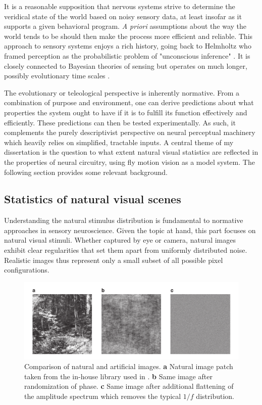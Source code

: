 It is a reasonable supposition that nervous systems strive to determine the veridical state of the world based on noisy sensory data, at least insofar as it supports a given behavioral program. \textit{A priori} assumptions about the way the world tends to be should then make the process more efficient and reliable. This approach to sensory systems enjoys a rich history, going back to Helmholtz who framed perception as the probabilistic problem of "unconscious inference" \citep{Helmholtz:1867aa}. It is closely connected to Bayesian theories of sensing but operates on much longer, possibly evolutionary time scales \citep{Doya:2007aa}.

The evolutionary or teleological perspective is inherently normative. From a combination of purpose and environment, one can derive predictions about what properties the system ought to have if it is to fulfill its function effectively and efficiently. These predictions can then be tested experimentally. As such, it complements the purely descriptivist perspective on neural perceptual machinery which heavily relies on simplified, tractable inputs. A central theme of my dissertation is the question to what extent natural visual statistics are reflected in the properties of neural circuitry, using fly motion vision as a model system. The following section provides some relevant background.

\subsection{Statistics of natural visual scenes}
Understanding the natural stimulus distribution is fundamental to normative approaches in sensory neuroscience. Given the topic at hand, this part focuses on natural visual stimuli. Whether captured by eye or camera, natural images exhibit clear regularities that set them apart from uniformly distributed noise. Realistic images thus represent only a small subset of all possible pixel configurations.

\begin{figure}
    \centering
    \includegraphics[width=1.025\textwidth]{graphics/figure_images}
    \caption[Natural and artificial images]
    {Comparison of natural and artificial images. \textbf{a} Natural image patch taken from the in-house library used in \citet{Leonhardt:2016ex}. \textbf{b} Same image after randomization of phase. \textbf{c} Same image after additional flattening of the amplitude spectrum which removes the typical $1/f$ distribution.}
    \label{fig:image}
\end{figure}


